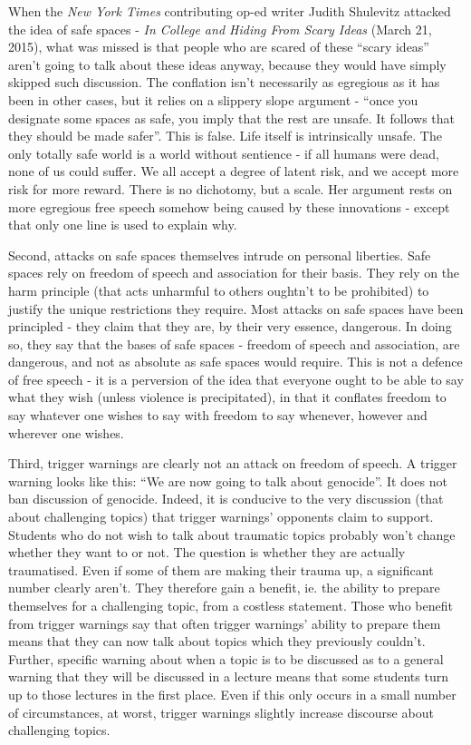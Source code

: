 When the \emph{New York Times} contributing op-ed writer Judith
Shulevitz attacked the idea of safe spaces - \emph{In College and Hiding
From Scary Ideas} (March 21, 2015), what was missed is that people who
are scared of these ``scary ideas'' aren't going to talk about these
ideas anyway, because they would have simply skipped such discussion.
The conflation isn't necessarily as egregious as it has been in other
cases, but it relies on a slippery slope argument - ``once you designate
some spaces as safe, you imply that the rest are unsafe. It follows that
they should be made safer''. This is false. Life itself is intrinsically
unsafe. The only totally safe world is a world without sentience - if
all humans were dead, none of us could suffer. We all accept a degree of
latent risk, and we accept more risk for more reward. There is no
dichotomy, but a scale. Her argument rests on more egregious free speech
somehow being caused by these innovations - except that only one line is
used to explain why.

Second, attacks on safe spaces themselves intrude on personal liberties.
Safe spaces rely on freedom of speech and association for their basis.
They rely on the harm principle (that acts unharmful to others oughtn't
to be prohibited) to justify the unique restrictions they require. Most
attacks on safe spaces have been principled - they claim that they are,
by their very essence, dangerous. In doing so, they say that the bases
of safe spaces - freedom of speech and association, are dangerous, and
not as absolute as safe spaces would require. This is not a defence of
free speech - it is a perversion of the idea that everyone ought to be
able to say what they wish (unless violence is precipitated), in that it
conflates freedom to say whatever one wishes to say with freedom to say
whenever, however and wherever one wishes.

Third, trigger warnings are clearly not an attack on freedom of speech.
A trigger warning looks like this: ``We are now going to talk about
genocide''. It does not ban discussion of genocide. Indeed, it is
conducive to the very discussion (that about challenging topics) that
trigger warnings' opponents claim to support. Students who do not wish
to talk about traumatic topics probably won't change whether they want
to or not. The question is whether they are actually traumatised. Even
if some of them are making their trauma up, a significant number clearly
aren't. They therefore gain a benefit, ie. the ability to prepare
themselves for a challenging topic, from a costless statement. Those who
benefit from trigger warnings say that often trigger warnings' ability
to prepare them means that they can now talk about topics which they
previously couldn't. Further, specific warning about when a topic is to
be discussed as to a general warning that they will be discussed in a
lecture means that some students turn up to those lectures in the first
place. Even if this only occurs in a small number of circumstances, at
worst, trigger warnings slightly increase discourse about challenging
topics.

